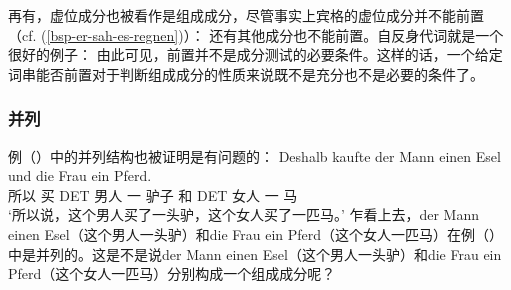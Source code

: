 再有，虚位成分也被看作是组成成分，尽管事实上宾格的虚位成分并不能前置（cf. (\ref{bsp-er-sah-es-regnen})）：
\eal
{}
\zl
还有其他成分也不能前置。自反身代词就是一个很好的例子：
\eal
{}
\zl
由此可见，前置并不是成分测试的必要条件。这样的话，一个给定词串能否前置对于判断组成成分的性质来说既不是充分也不是必要的条件了。

\subsubsection{并列}
\label{Abschnitt-K-Tests-Koordination}
例（）中的并列结构也被证明是有问题的：
\ea
\label{ex-gapping}
\gll Deshalb kaufte der Mann einen Esel und die Frau ein Pferd.\\
	 所以 买 DET 男人 一 驴子 和 DET 女人 一 马\\
\glt `所以说，这个男人买了一头驴，这个女人买了一匹马。'
\z
乍看上去，der Mann einen Esel（这个男人一头驴）和die Frau ein Pferd（这个女人一匹马）在例（）中是并列的。这是不是说der Mann einen Esel（这个男人一头驴）和die Frau ein Pferd（这个女人一匹马）分别构成一个组成成分呢？

